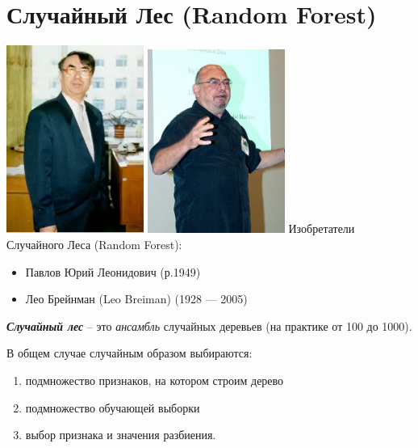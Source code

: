 \documentclass{beamer}
\newcommand{\termdef}[1]{\textbf{\textit{#1}}}
\newcommand{\term}{\textit}
\begin{document}
\section{Случайный Лес (Random Forest)}\label{section:random_forest}

\begin{frame}
	\includegraphics[width=4.5cm]{../pic/ylpavlov.png}
	\includegraphics[width=4.5cm]{../pic/leo_breiman.png}
	Изобретатели Случайного Леса (Random Forest):
	\begin{itemize}
		\item Павлов Юрий Леонидович (р.1949)
		\item Лео Брейнман (Leo Breiman) (1928 — 2005)
	\end{itemize}
\end{frame}

\begin{frame}
	\termdef{Случайный лес} -- это \term{ансамбль}
	случайных деревьев (на практике от 100 до 1000).
	
	В общем случае случайным образом выбираются:
	\begin{enumerate}
		\item подмножество признаков, на котором строим дерево
		\item подмножество обучающей выборки
		\item выбор признака и значения разбиения.
	\end{enumerate}	
\end{frame}
  
\end{document}
